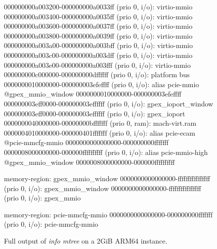 \begin{figure}[ht]
\begin{minipage}{0.48\linewidth}
\begin{ffcode}
        000000000a003200-000000000a0033ff (prio 0, i/o): virtio-mmio
        000000000a003400-000000000a0035ff (prio 0, i/o): virtio-mmio
        000000000a003600-000000000a0037ff (prio 0, i/o): virtio-mmio
        000000000a003800-000000000a0039ff (prio 0, i/o): virtio-mmio
        000000000a003a00-000000000a003bff (prio 0, i/o): virtio-mmio
        000000000a003c00-000000000a003dff (prio 0, i/o): virtio-mmio
        000000000a003e00-000000000a003fff (prio 0, i/o): virtio-mmio
        000000000c000000-000000000dffffff (prio 0, i/o): platform bus
        0000000010000000-000000003efeffff (prio 0, i/o): alias pcie-mmio @gpex_mmio_window 0000000010000000-000000003efeffff
        000000003eff0000-000000003effffff (prio 0, i/o): gpex_ioport_window
          000000003eff0000-000000003effffff (prio 0, i/o): gpex_ioport
        0000000040000000-00000000bfffffff (prio 0, ram): mach-virt.ram
        0000004010000000-000000401fffffff (prio 0, i/o): alias pcie-ecam @pcie-mmcfg-mmio 0000000000000000-000000000fffffff
        0000008000000000-000000ffffffffff (prio 0, i/o): alias pcie-mmio-high @gpex_mmio_window 0000008000000000-000000ffffffffff

    memory-region: gpex_mmio_window
      0000000000000000-ffffffffffffffff (prio 0, i/o): gpex_mmio_window
        0000000000000000-ffffffffffffffff (prio 0, i/o): gpex_mmio

    memory-region: pcie-mmcfg-mmio
      0000000000000000-000000000fffffff (prio 0, i/o): pcie-mmcfg-mmio
  \end{ffcode}
  \end{minipage}
  \caption{Full output of \emph{info mtree} on a 2GiB ARM64 instance.}
  \label{fig:mem_ARM_full}
\end{figure}

